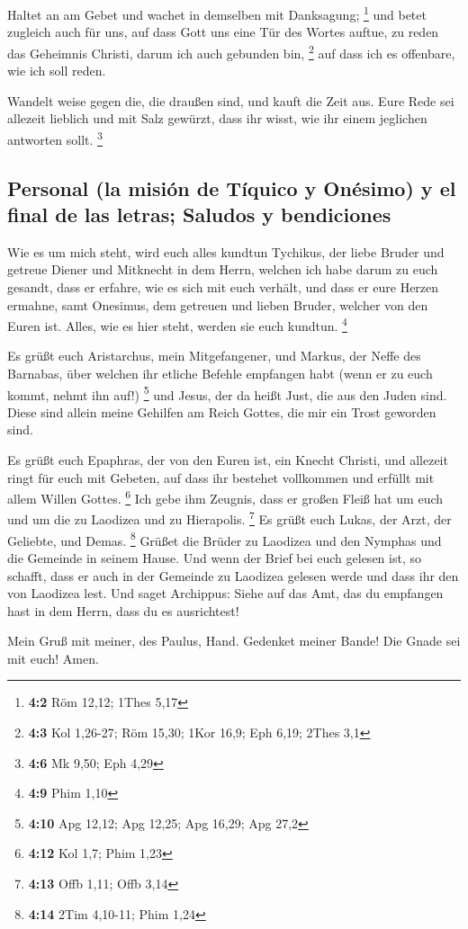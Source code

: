  Haltet an am Gebet und wachet in demselben mit
Danksagung; \footnote{\textbf{4:2} Röm 12,12; 1Thes 5,17} 
und betet zugleich auch für uns, auf dass Gott uns eine Tür des Wortes
auftue, zu reden das Geheimnis Christi, darum ich auch gebunden bin,
\footnote{\textbf{4:3} Kol 1,26-27; Röm 15,30; 1Kor 16,9; Eph 6,19;
  2Thes 3,1}  auf dass ich es offenbare, wie ich soll
reden.

 Wandelt weise gegen die, die draußen sind, und kauft die
Zeit aus.  Eure Rede sei allezeit lieblich und mit Salz
gewürzt, dass ihr wisst, wie ihr einem jeglichen antworten sollt.
\footnote{\textbf{4:6} Mk 9,50; Eph 4,29}

\hypertarget{personal-la-misiuxf3n-de-tuxedquico-y-onuxe9simo-y-el-final-de-las-letras-saludos-y-bendiciones}{%
\subsection{Personal (la misión de Tíquico y Onésimo) y el final de las
letras; Saludos y
bendiciones}\label{personal-la-misiuxf3n-de-tuxedquico-y-onuxe9simo-y-el-final-de-las-letras-saludos-y-bendiciones}}

 Wie es um mich steht, wird euch alles kundtun Tychikus,
der liebe Bruder und getreue Diener und Mitknecht in dem Herrn,
 welchen ich habe darum zu euch gesandt, dass er erfahre,
wie es sich mit euch verhält, und dass er eure Herzen ermahne,
 samt Onesimus, dem getreuen und lieben Bruder, welcher
von den Euren ist. Alles, wie es hier steht, werden sie euch kundtun.
\footnote{\textbf{4:9} Phim 1,10}

 Es grüßt euch Aristarchus, mein Mitgefangener, und
Markus, der Neffe des Barnabas, über welchen ihr etliche Befehle
empfangen habt (wenn er zu euch kommt, nehmt ihn auf!) \footnote{\textbf{4:10}
  Apg 12,12; Apg 12,25; Apg 16,29; Apg 27,2}  und Jesus,
der da heißt Just, die aus den Juden sind. Diese sind allein meine
Gehilfen am Reich Gottes, die mir ein Trost geworden sind.

 Es grüßt euch Epaphras, der von den Euren ist, ein
Knecht Christi, und allezeit ringt für euch mit Gebeten, auf dass ihr
bestehet vollkommen und erfüllt mit allem Willen Gottes. \footnote{\textbf{4:12}
  Kol 1,7; Phim 1,23}  Ich gebe ihm Zeugnis, dass er
großen Fleiß hat um euch und um die zu Laodizea und zu Hierapolis.
\footnote{\textbf{4:13} Offb 1,11; Offb 3,14}  Es grüßt
euch Lukas, der Arzt, der Geliebte, und Demas. \footnote{\textbf{4:14}
  2Tim 4,10-11; Phim 1,24}  Grüßet die Brüder zu Laodizea
und den Nymphas und die Gemeinde in seinem Hause.  Und
wenn der Brief bei euch gelesen ist, so schafft, dass er auch in der
Gemeinde zu Laodizea gelesen werde und dass ihr den von Laodizea lest.
 Und saget Archippus: Siehe auf das Amt, das du empfangen
hast in dem Herrn, dass du es ausrichtest!

 Mein Gruß mit meiner, des Paulus, Hand. Gedenket meiner
Bande! Die Gnade sei mit euch! Amen.
